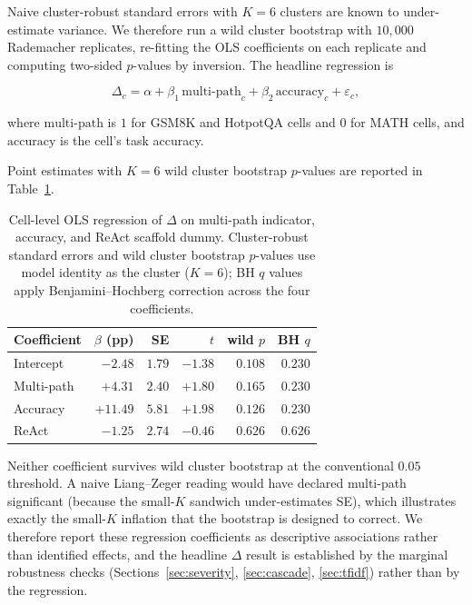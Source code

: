 \documentclass[11pt]{article}
\begin{document}
Naive cluster-robust standard errors with $K=6$ clusters are known to under-estimate variance. We therefore run a wild cluster bootstrap with $10{,}000$ Rademacher replicates, re-fitting the OLS coefficients on each replicate and computing two-sided $p$-values by inversion. The headline regression is

\begin{equation}
\Delta_c = \alpha + \beta_1\, \mathrm{multi\text{-}path}_c + \beta_2\, \mathrm{accuracy}_c + \varepsilon_c,
\label{eq:reg}
\end{equation}

where $\mathrm{multi\text{-}path}$ is $1$ for GSM8K and HotpotQA cells and $0$ for MATH cells, and $\mathrm{accuracy}$ is the cell's task accuracy.

Point estimates with $K=6$ wild cluster bootstrap $p$-values are reported in Table~\ref{tab:reg}.

\begin{table}[t]
  \centering
  \small
  \begin{tabular}{@{}lrrrrr@{}}
    \toprule
    Coefficient & $\beta$ (pp) & SE & $t$ & wild $p$ & BH $q$ \\
    \midrule
    Intercept & $-2.48$ & $1.79$ & $-1.38$ & $0.108$ & $0.230$ \\
    Multi-path & $+4.31$ & $2.40$ & $+1.80$ & $0.165$ & $0.230$ \\
    Accuracy & $+11.49$ & $5.81$ & $+1.98$ & $0.126$ & $0.230$ \\
    ReAct & $-1.25$ & $2.74$ & $-0.46$ & $0.626$ & $0.626$ \\
    \bottomrule
  \end{tabular}
  \caption{Cell-level OLS regression of $\Delta$ on multi-path indicator, accuracy, and ReAct scaffold dummy. Cluster-robust standard errors and wild cluster bootstrap $p$-values use model identity as the cluster ($K=6$); BH $q$ values apply Benjamini--Hochberg correction \citep{Benjamini1995FDR} across the four coefficients.}
  \label{tab:reg}
\end{table}

Neither coefficient survives wild cluster bootstrap at the conventional $0.05$ threshold. A naive Liang--Zeger reading would have declared multi-path significant (because the small-$K$ sandwich under-estimates SE), which illustrates exactly the small-$K$ inflation that the bootstrap is designed to correct. We therefore report these regression coefficients as descriptive associations rather than identified effects, and the headline $\Delta$ result is established by the marginal robustness checks (Sections~\ref{sec:severity}, \ref{sec:cascade}, \ref{sec:tfidf}) rather than by the regression.
\end{document}
